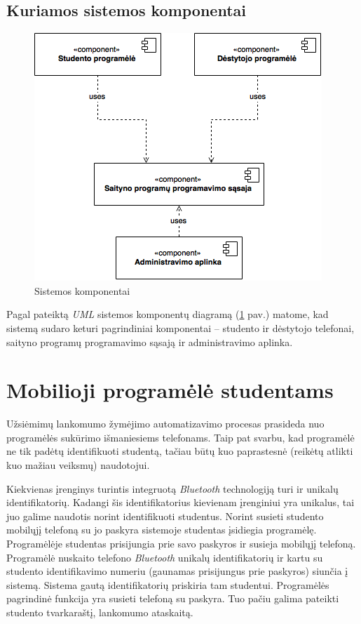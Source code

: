 \documentclass{VUMIFPSbakalaurinis}
\begin{document}
\subsection{Kuriamos sistemos komponentai}

\begin{figure}[H]
	\centering
	\includegraphics[scale=0.5]{img/kursinio_component}
	\caption{Sistemos komponentai}
	\label{img:componentDiagram}
\end{figure}

Pagal pateiktą \textit{UML} sistemos komponentų diagramą (\ref{img:componentDiagram} pav.) matome, kad sistemą sudaro keturi pagrindiniai komponentai – studento ir dėstytojo telefonai, saityno programų programavimo sąsają ir administravimo aplinka.

\section{Mobilioji programėlė studentams} \label{StudentApp}

Užsiėmimų lankomumo žymėjimo automatizavimo procesas prasideda nuo programėlės sukūrimo išmaniesiems telefonams. Taip pat svarbu, kad programėlė ne tik padėtų identifikuoti studentą, tačiau būtų kuo paprastesnė (reikėtų atlikti kuo mažiau veiksmų) naudotojui.

Kiekvienas įrenginys turintis integruotą \textit{Bluetooth} technologiją turi ir unikalų identifikatorių. Kadangi šis identifikatorius kievienam įrenginiui yra unikalus, tai juo galime naudotis norint identifikuoti studentus. Norint susieti studento mobilųjį telefoną su jo paskyra sistemoje studentas įsidiegia programėlę. Programėlėje studentas prisijungia prie savo paskyros ir susieja mobilųjį telefoną. Programėlė nuskaito telefono \textit{Bluetooth} unikalų identifikatorių ir kartu su studento identifikavimo numeriu (gaunamas prisijungus prie paskyros) siunčia į sistemą. Sistema gautą identifikatorių priskiria tam studentui. Programėlės pagrindinė funkcija yra susieti telefoną su paskyra. Tuo pačiu galima pateikti studento tvarkaraštį, lankomumo ataskaitą.
\end{document}
